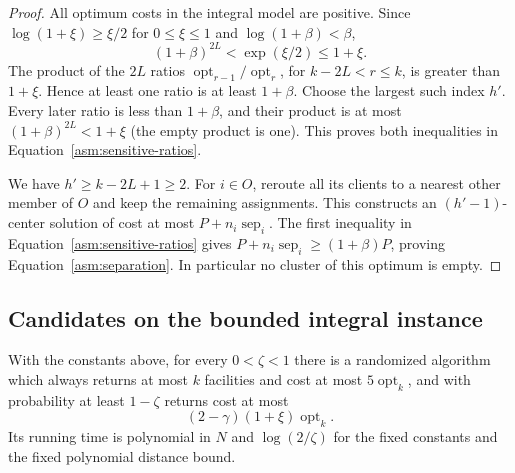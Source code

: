 \begin{proof}
All optimum costs in the integral model are positive. Since
$\log(1+\xi)\ge\xi/2$ for $0\le\xi\le1$ and
$\log(1+\beta)<\beta$,
\begin{equation}\label{asm:product-bound}
 (1+\beta)^{2L}<\exp(\xi/2)\le1+\xi.
\end{equation}
The product of the $2L$ ratios
$\operatorname{opt}_{r-1}/\operatorname{opt}_r$, for
$k-2L<r\le k$, is greater than $1+\xi$. Hence at least one
ratio is at least $1+\beta$. Choose the largest such index $h'$.
Every later ratio is less than $1+\beta$, and their product is
at most $(1+\beta)^{2L}<1+\xi$ (the empty product is one).
This proves both inequalities in
Equation~\eqref{asm:sensitive-ratios}.

We have $h'\ge k-2L+1\ge2$. For $i\in O$, reroute all its
clients to a nearest other member of $O$ and keep the remaining
assignments. This constructs an $(h'-1)$-center solution of cost
at most $P+n_i\operatorname{sep}_i$. The first inequality in
Equation~\eqref{asm:sensitive-ratios} gives
$P+n_i\operatorname{sep}_i\ge(1+\beta)P$, proving
Equation~\eqref{asm:separation}. In particular no cluster of this
optimum is empty.
\end{proof}

\subsection{Candidates on the bounded integral instance}

\begin{proposition}\label{asm:integral}
With the constants above, for every $0<\zeta<1$ there is a randomized
algorithm which always returns at most $k$ facilities and cost at
most $5\operatorname{opt}_k$, and with probability at least
$1-\zeta$ returns cost at most
\begin{equation}\label{asm:integral-guarantee}
 (2-\gamma)(1+\xi)\operatorname{opt}_k.
\end{equation}
Its running time is polynomial in $N$ and $\log(2/\zeta)$ for the
fixed constants and the fixed polynomial distance bound.
\end{proposition}


